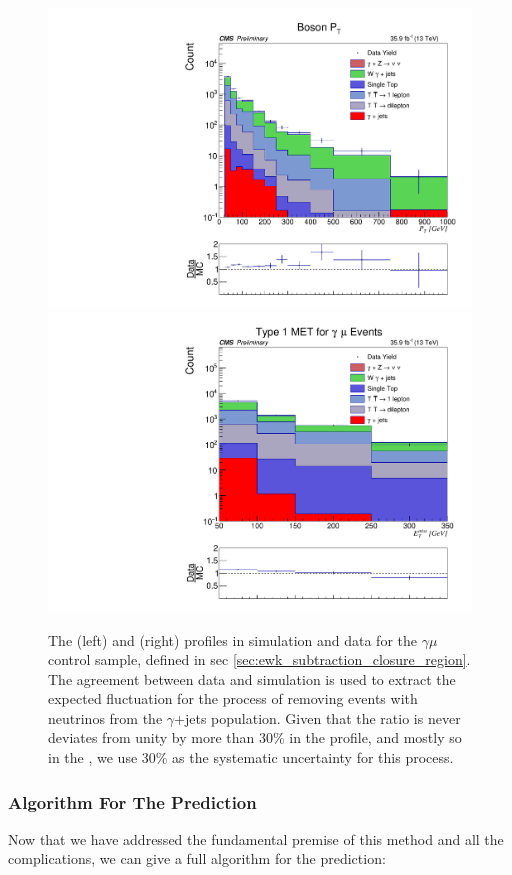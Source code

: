       \begin{figure}[h!]
        \centering
        \includegraphics[width=.46\textwidth]{figures/datavsmc/mugamma/BosonPT_widebin.pdf}
        \includegraphics[width=.46\textwidth]{figures/datavsmc/mugamma/Type1MET_SRBin.pdf}
        \caption{The \pt (left) and \MET (right) profiles in simulation and data for the $\gamma \mu$ control sample, defined in sec \ref{sec:ewk_subtraction_closure_region}. The agreement between data and simulation is used to extract the expected fluctuation for the process of removing events with neutrinos from the $\gamma$+jets population. Given that the ratio is never deviates from unity by more than 30\% in the \MET profile, and mostly so in the \pt, we use 30\% as the systematic uncertainty for this process.}
        \label{fig:gamma_mu_closure}
      \end{figure}



    \subsubsection{Algorithm For The Prediction}

      Now that we have addressed the fundamental premise of this method and all the complications, we can give a full algorithm for the prediction:

